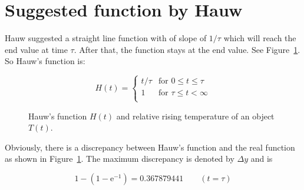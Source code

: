 \documentclass[12pt]{article}
\def\me{\mathrm{e}}
\def\hf{0.45\textwidth}
\begin{document}
\section{Suggested function by Hauw}
Hauw suggested a straight line function with of slope of $1/\tau$ which will reach the end value at time $\tau$. After that, the function stays at the end value. See Figure~\ref{fig3}. So Hauw's function is:

\begin{equation}
H(t) = \begin{cases}
t/\tau & \text{for } 0\leq t\leq \tau\\
1      & \text{for } \tau\leq t < \infty\\
\end{cases}
\end{equation}

\begin{figure}[!ht]
\centering
{}
\caption{Hauw's function $H(t)$ and relative rising temperature of an object $T(t)$.}
\label{fig3}
\end{figure}

Obviously, there is a discrepancy between Hauw's function and the real function as shown in Figure~\ref{fig3}. The maximum discrepancy is denoted by $\Delta y$ and is

\begin{equation}
1 - (1-\me^{-1}) = 0.367879441 \qquad (t=\tau)
\end{equation}
\end{document}

